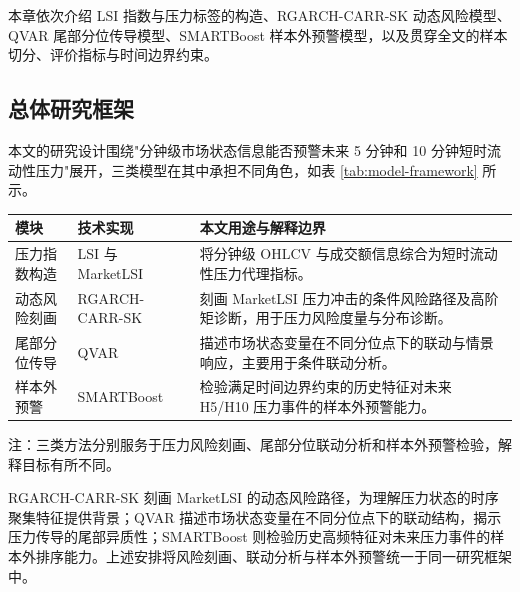 \documentclass[12pt,a4paper]{ctexart}
\begin{document}
本章依次介绍 LSI 指数与压力标签的构造、RGARCH-CARR-SK 动态风险模型、QVAR 尾部分位传导模型、SMARTBoost 样本外预警模型，以及贯穿全文的样本切分、评价指标与时间边界约束。

\subsection{总体研究框架}
\label{subsec:framework}

本文的研究设计围绕"分钟级市场状态信息能否预警未来 5 分钟和 10 分钟短时流动性压力"展开，三类模型在其中承担不同角色，如表 \ref{tab:model-framework} 所示。

\begin{center}
\begingroup
\captionsetup{type=table}
\begin{minipage}{\textwidth}
\centering
{}
\label{tab:model-framework}
\small
\begin{threeparttable}
\begin{tabularx}{\textwidth}{p{}p{}Y}
\toprule
模块 & 技术实现 & 本文用途与解释边界 \\
\midrule
压力指数构造 & LSI 与 MarketLSI & 将分钟级 OHLCV 与成交额信息综合为短时流动性压力代理指标。 \\
动态风险刻画 & RGARCH-CARR-SK & 刻画 MarketLSI 压力冲击的条件风险路径及高阶矩诊断，用于压力风险度量与分布诊断。 \\
尾部分位传导 & QVAR & 描述市场状态变量在不同分位点下的联动与情景响应，主要用于条件联动分析。 \\
样本外预警 & SMARTBoost & 检验满足时间边界约束的历史特征对未来 H5/H10 压力事件的样本外预警能力。 \\
\bottomrule
\end{tabularx}
\begin{tablenotes}[flushleft]
\footnotesize
\item 注：三类方法分别服务于压力风险刻画、尾部分位联动分析和样本外预警检验，解释目标有所不同。
\end{tablenotes}
\end{threeparttable}
\end{minipage}
\endgroup
\end{center}

RGARCH-CARR-SK 刻画 MarketLSI 的动态风险路径，为理解压力状态的时序聚集特征提供背景；QVAR 描述市场状态变量在不同分位点下的联动结构，揭示压力传导的尾部异质性；SMARTBoost 则检验历史高频特征对未来压力事件的样本外排序能力。上述安排将风险刻画、联动分析与样本外预警统一于同一研究框架中。
\end{document}
